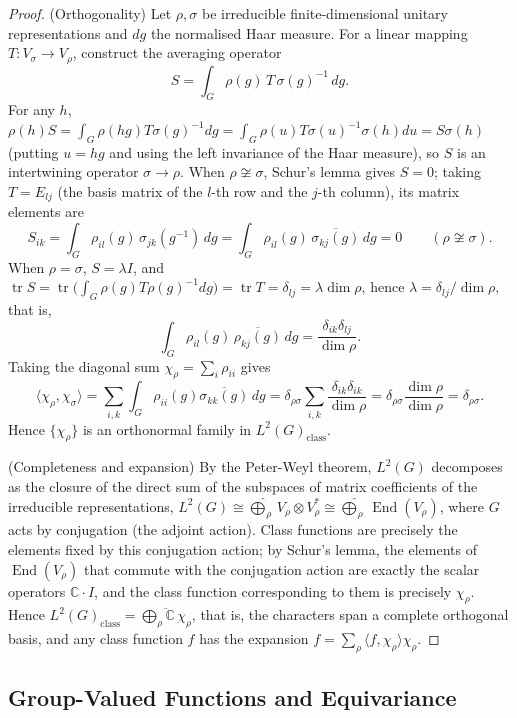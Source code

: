 \begin{proof}
(Orthogonality) Let $\rho,\sigma$ be irreducible finite-dimensional unitary representations and $dg$ the normalised Haar measure. For a linear mapping $T:V_\sigma\to V_\rho$, construct the averaging operator
\[
S=\int_G \rho(g)\,T\,\sigma(g)^{-1}\,dg.
\]
For any $h$, $\rho(h)S=\int_G\rho(hg)T\sigma(g)^{-1}dg=\int_G\rho(u)T\sigma(u)^{-1}\sigma(h)du=S\sigma(h)$ (putting $u=hg$ and using the left invariance of the Haar measure), so $S$ is an intertwining operator $\sigma\to\rho$. When $\rho\not\cong\sigma$, Schur's lemma gives $S=0$; taking $T=E_{lj}$ (the basis matrix of the $l$-th row and the $j$-th column), its matrix elements are
\[
S_{ik}=\int_G \rho_{il}(g)\,\sigma_{jk}(g^{-1})\,dg=\int_G \rho_{il}(g)\,\overline{\sigma_{kj}(g)}\,dg=0 \qquad(\rho\not\cong\sigma).
\]
When $\rho=\sigma$, $S=\lambda I$, and $\operatorname{tr}S=\operatorname{tr}\big(\int_G\rho(g)T\rho(g)^{-1}dg\big)=\operatorname{tr}T=\delta_{lj}=\lambda\dim\rho$, hence $\lambda=\delta_{lj}/\dim\rho$, that is,
\[
\int_G \rho_{il}(g)\,\overline{\rho_{kj}(g)}\,dg = \frac{\delta_{ik}\delta_{lj}}{\dim\rho}.
\]
Taking the diagonal sum $\chi_\rho=\sum_i\rho_{ii}$ gives
\[
\langle\chi_\rho,\chi_\sigma\rangle=\sum_{i,k}\int_G\rho_{ii}(g)\overline{\sigma_{kk}(g)}\,dg=\delta_{\rho\sigma}\sum_{i,k}\frac{\delta_{ik}\delta_{ik}}{\dim\rho}=\delta_{\rho\sigma}\frac{\dim\rho}{\dim\rho}=\delta_{\rho\sigma}.
\]
Hence $\{\chi_\rho\}$ is an orthonormal family in $L^2(G)_{\text{class}}$.

(Completeness and expansion) By the Peter-Weyl theorem, $L^2(G)$ decomposes as the closure of the direct sum of the subspaces of matrix coefficients of the irreducible representations, $L^2(G)\cong\widehat{\bigoplus}_\rho\,V_\rho\otimes V_\rho^*\cong\widehat{\bigoplus}_\rho\,\operatorname{End}(V_\rho)$, where $G$ acts by conjugation (the adjoint action). Class functions are precisely the elements fixed by this conjugation action; by Schur's lemma, the elements of $\operatorname{End}(V_\rho)$ that commute with the conjugation action are exactly the scalar operators $\mathbb{C}\cdot I$, and the class function corresponding to them is precisely $\chi_\rho$. Hence $L^2(G)_{\text{class}}=\overline{\bigoplus_\rho\mathbb{C}\,\chi_\rho}$, that is, the characters span a complete orthogonal basis, and any class function $f$ has the expansion $f=\sum_\rho\langle f,\chi_\rho\rangle\chi_\rho$.
\end{proof}

\subsection{Group-Valued Functions and Equivariance}

